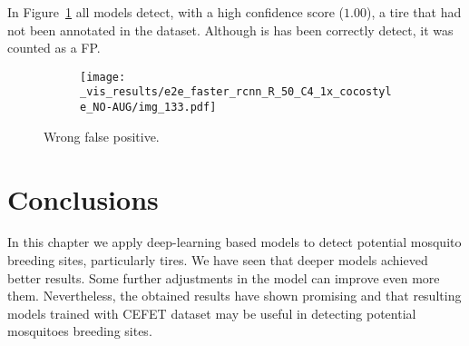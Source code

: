 In Figure~\ref{fig:wrong_fp} all models detect, with a high confidence score ($1.00$), a tire that had not been annotated in the dataset.
Although is has been correctly detect, it was counted as a FP.

\begin{figure}[th!]
  \centering
  \begin{subfigure}[t]{\linewidth}
    \centering
    \texttt{[image: \_vis\_results/e2e\_faster\_rcnn\_R\_50\_C4\_1x\_cocostyle\_NO-AUG/img\_133.pdf]}
  \end{subfigure}%
  \caption{Wrong false positive.}
  \label{fig:wrong_fp}
\end{figure}


\section{Conclusions}
%
In this chapter we apply deep-learning based models to detect potential mosquito breeding sites, particularly tires.
We have seen that deeper models achieved better results.
Some further adjustments in the model can improve even more them.
Nevertheless, the obtained results have shown promising and that resulting models trained with CEFET dataset may be useful in detecting potential mosquitoes breeding sites.










